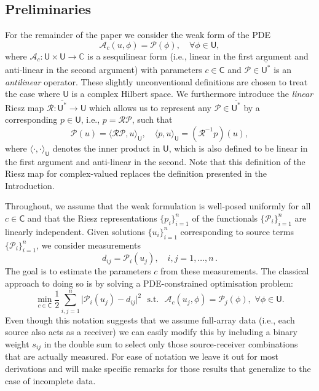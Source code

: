 \documentclass[12pt]{amsart}
\begin{document}
\subsection{Preliminaries}
For the remainder of the paper we consider the weak form of the PDE
\begin{equation}\label{eq:weak}
\mathcal{A}_c(u, \phi) = \mathcal{P}(\phi), \quad \forall\phi\in \mathsf{U},
\end{equation}
where $\mathcal{A}_c:\mathsf{U}\times \mathsf{U} \rightarrow \mathbb{C}$ is a sesquilinear form (i.e., linear in the first argument and anti-linear in the second argument) with parameters $c \in \mathsf{C}$ and $\mathcal{P} \in \overline{\mathsf{U}^*}$ is an \emph{antilinear} operator. These slightly unconventional definitions are chosen to treat the case where $\mathsf{U}$ is a complex Hilbert space. We furthermore introduce the \emph{linear} Riesz map $\mathcal{R}:\overline{\mathsf{U}^*}\rightarrow \mathsf{U}$ which allows us to represent any $\mathcal{P}\in \overline{\mathsf{U}^*}$ by a corresponding $p\in\mathsf{U}$, i.e., $p = \mathcal{R}\mathcal{P}$, such that 
\[
\mathcal{P}(u) = \langle \mathcal{R}\mathcal{P}, u\rangle_{\mathsf{U}},\quad \langle p, u\rangle_{\mathsf{U}} = \left(\mathcal{R}^{-1}p\right)(u),
\]
where $\langle \cdot, \cdot\rangle_\mathsf{U}$ denotes the inner product in $\mathsf{U}$, which is also defined to be linear in the first argument and anti-linear in the second. Note that this definition of the Riesz map for complex-valued replaces the definition presented in the Introduction.

Throughout, we assume that the weak formulation is well-posed uniformly for all $c \in \mathsf{C}$ and that the Riesz representations $\{p_i\}_{i=1}^n$ of the functionals $\{\mathcal{P}_i\}_{i=1}^n$ are linearly independent. Given solutions $\{u_i\}_{i=1}^n$ corresponding to source terms $\{\mathcal{P}_i\}_{i=1}^n$, we consider measurements
\[
d_{ij} = \mathcal{P}_i(u_j),\quad i,j = 1,\ldots, n\,.
\]
The goal is to estimate the parameters $c$ from these measurements. The classical approach to doing so is by solving a PDE-constrained optimisation problem:
\begin{equation}\label{eq:FWI}
 \min_{c\in\mathsf{C}}  {\textstyle\frac{1}{2}} \sum_{i,j=1}^{n}   \big|\mathcal{P}_i(u_j) - d_{ij}\big|^2\,\,\,\,\text{s.t.}\,\,\,\,\mathcal{A}_c(u_j,\phi) = \mathcal{P}_j(\phi),\,\,\forall\phi\in \mathsf{U}.
 \end{equation}
{Even though this notation suggests that we assume full-array data (i.e., each source also acts as a receiver) we can easily modify this by including a binary weight $s_{ij}$ in the double sum to select only those source-receiver combinations that are actually measured. For ease of notation we leave it out for most derivations and will make specific remarks for those results that generalize to the case of incomplete data.}
\end{document}
